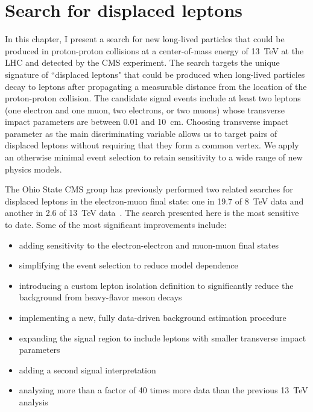 \chapter{Search for displaced leptons}
\label{displaced_leptons}
In this chapter, I present a search for new long-lived particles that could be produced in proton-proton collisions at a center-of-mass energy of \SI{13}{\TeV} at the LHC and detected by the CMS experiment. The search targets the unique signature of ``displaced leptons" that could be produced when long-lived particles decay to leptons after propagating a measurable distance from the location of the proton-proton collision. The candidate signal events include at least two leptons (one electron and one muon, two electrons, or two muons) whose transverse impact parameters are between \num{0.01} and \SI{10}{\cm}. Choosing transverse impact parameter as the main discriminating variable allows us to target pairs of displaced leptons without requiring that they form a common vertex. We apply an otherwise minimal event selection to retain sensitivity to a wide range of new physics models.

The Ohio State CMS group has previously performed two related searches for displaced leptons in the electron-muon final state: one in \SI{19.7}{\invfb} of \SI{8}{\TeV} data and another in \SI{2.6}{\invfb} of \SI{13}{\TeV} data~\cite{displaced_leptons_run1, displaced_leptons_bing}. The search presented here is the most sensitive to date. Some of the most significant improvements include:
\begin{itemize}
    \itemsep0em
    \item adding sensitivity to the electron-electron and muon-muon final states
    \item simplifying the event selection to reduce model dependence
    \item introducing a custom lepton isolation definition to significantly reduce the background from heavy-flavor meson decays
    \item implementing a new, fully data-driven background estimation procedure
    \item expanding the signal region to include leptons with smaller transverse impact parameters
    \item adding a second signal interpretation
    \item analyzing more than a factor of \num{40} times more data than the previous \SI{13}{\TeV} analysis~\cite{displaced_leptons_bing}
\end{itemize}

